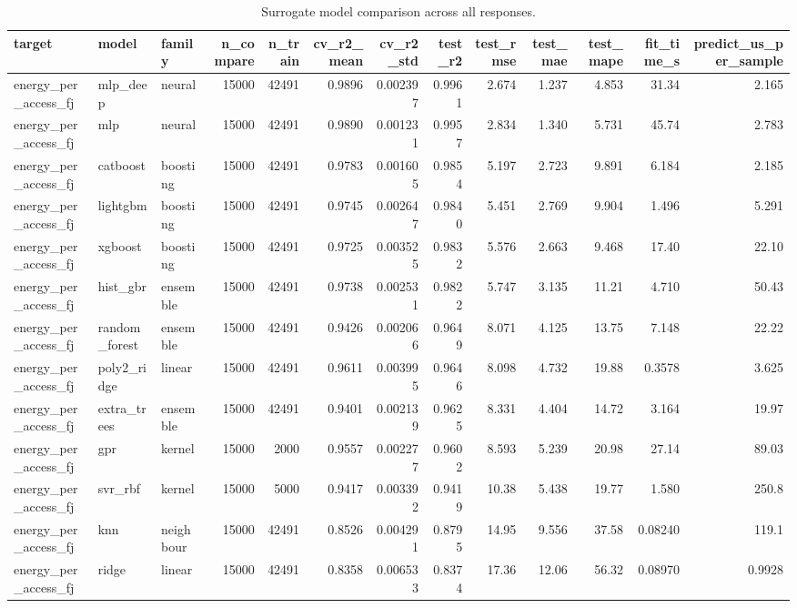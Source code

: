 \begin{table}[!t]
\centering
\caption{Surrogate model comparison across all responses.}
\label{tab:surrogate_leaderboard_main}
\footnotesize
\begin{tabular}{lllrrrrrrrrrr}
\toprule
target & model & family & n\_compare & n\_train & cv\_r2\_mean & cv\_r2\_std & test\_r2 & test\_rmse & test\_mae & test\_mape & fit\_time\_s & predict\_us\_per\_sample \\
\midrule
energy\_per\_access\_fj & mlp\_deep & neural & 15000 & 42491 & 0.9896 & 0.002397 & 0.9961 & 2.674 & 1.237 & 4.853 & 31.34 & 2.165 \\
energy\_per\_access\_fj & mlp & neural & 15000 & 42491 & 0.9890 & 0.001231 & 0.9957 & 2.834 & 1.340 & 5.731 & 45.74 & 2.783 \\
energy\_per\_access\_fj & catboost & boosting & 15000 & 42491 & 0.9783 & 0.001605 & 0.9854 & 5.197 & 2.723 & 9.891 & 6.184 & 2.185 \\
energy\_per\_access\_fj & lightgbm & boosting & 15000 & 42491 & 0.9745 & 0.002647 & 0.9840 & 5.451 & 2.769 & 9.904 & 1.496 & 5.291 \\
energy\_per\_access\_fj & xgboost & boosting & 15000 & 42491 & 0.9725 & 0.003525 & 0.9832 & 5.576 & 2.663 & 9.468 & 17.40 & 22.10 \\
energy\_per\_access\_fj & hist\_gbr & ensemble & 15000 & 42491 & 0.9738 & 0.002531 & 0.9822 & 5.747 & 3.135 & 11.21 & 4.710 & 50.43 \\
energy\_per\_access\_fj & random\_forest & ensemble & 15000 & 42491 & 0.9426 & 0.002066 & 0.9649 & 8.071 & 4.125 & 13.75 & 7.148 & 22.22 \\
energy\_per\_access\_fj & poly2\_ridge & linear & 15000 & 42491 & 0.9611 & 0.003995 & 0.9646 & 8.098 & 4.732 & 19.88 & 0.3578 & 3.625 \\
energy\_per\_access\_fj & extra\_trees & ensemble & 15000 & 42491 & 0.9401 & 0.002139 & 0.9625 & 8.331 & 4.404 & 14.72 & 3.164 & 19.97 \\
energy\_per\_access\_fj & gpr & kernel & 15000 & 2000 & 0.9557 & 0.002277 & 0.9602 & 8.593 & 5.239 & 20.98 & 27.14 & 89.03 \\
energy\_per\_access\_fj & svr\_rbf & kernel & 15000 & 5000 & 0.9417 & 0.003392 & 0.9419 & 10.38 & 5.438 & 19.77 & 1.580 & 250.8 \\
energy\_per\_access\_fj & knn & neighbour & 15000 & 42491 & 0.8526 & 0.004291 & 0.8795 & 14.95 & 9.556 & 37.58 & 0.08240 & 119.1 \\
energy\_per\_access\_fj & ridge & linear & 15000 & 42491 & 0.8358 & 0.006533 & 0.8374 & 17.36 & 12.06 & 56.32 & 0.08970 & 0.9928 \\

\end{tabular}
\end{table}
